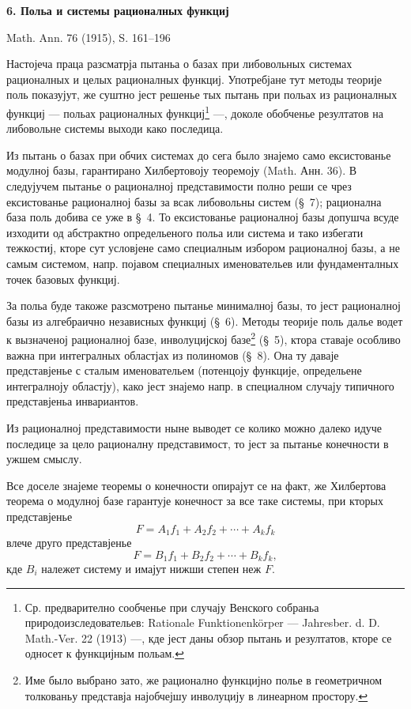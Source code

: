 ﻿\documentclass[11pt]{article}
\begin{document}
\begin{center}
{\Large\bfseries 6. Польа и системы рационалных функциј}\par
\vspace{1.2em}
Math. Ann. 76 (1915), S. 161--196
\end{center}

\vspace{2em}

Настојеча праца разсматрја пытаньа о базах при либовольных системах рационалных и целых рационалных функциј. Употребјане тут методы теорије поль показујут, же суштно јест решенье тых пытань при польах из рационалных функциј --- польах рационалных функциј\footnote{Ср. предварително сообченье при случају Венского собраньа природоизследовательев: Rationale Funktionenkörper --- Jahresber. d. D. Math.-Ver. 22 (1913) ---, кде јест даны обзор пытань и резултатов, кторе се односет к функцијным польам.} ---, доколе обобченье резултатов на либовольне системы выходи како последица.

Из пытань о базах при обчих системах до сега было знајемо само ексистованье модулној базы, гарантирано Хилбертовоју теоремоју (Math. Анн. 36). В следујучем пытанье о рационалној представимости полно реши се чрез ексистованье рационалној базы за всак либовольны систем (\S\ 7); рационална база поль добива се уже в \S\ 4. То ексистованье рационалној базы допушча всуде изходити од абстрактно определьеного польа или система и тако избегати тежкостиј, кторе сут условјене само специалным избором рационалној базы, а не самым системом, напр. појавом специалных именовательев или фундаменталных точек базовых функциј.

За польа буде такоже разсмотрено пытанье минималној базы, то јест рационалној базы из алгебраично независных функциј (\S\ 6). Методы теорије поль далье водет к вызначеној рационалној базе, инволуцијској базе\footnote{Име было выбрано зато, же рационално функцијно полье в геометричном толкованьу представја најобчејшу инволуцију в линеарном простору.} (\S\ 5), ктора ставаје особливо важна при интегралных областјах из полиномов (\S\ 8). Она ту даваје представјенье с сталым именовательем (потенцоју функције, определьене интегралноју областју), како јест знајемо напр. в специалном случају типичного представјеньа инвариантов.

Из рационалној представимости ныне выводет се колико можно далеко идуче последице за цело рационалну представимост, то јест за пытанье конечности в ужшем смыслу.

Все доселе знајеме теоремы о конечности опирајут се на факт, же Хилбертова теорема о модулној базе гарантује конечност за все таке системы, при кторых представјенье
\[
  F=A_1f_1+A_2f_2+\cdots+A_kf_k
\]
влече друго представјенье
\[
  F=B_1f_1+B_2f_2+\cdots+B_kf_k,
\]
кде $B_i$ належет систему и имајут нижши степен неж $F$.
\end{document}
